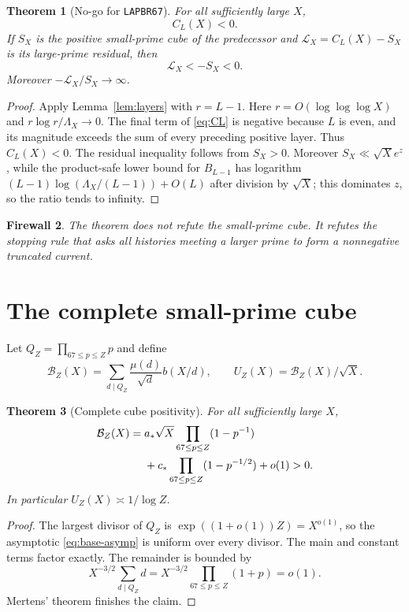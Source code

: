 \documentclass[11pt]{article}
\newtheorem{theorem}{Theorem}[section]
\newtheorem{firewall}[theorem]{Firewall}
\newcommand{\1}{\mathbf 1}
\begin{document}
\begin{theorem}[No-go for \texttt{LAPBR67}]\label{thm:no-go}
For all sufficiently large $X$,
\[
 C_L(X)<0.
\]
If $S_X$ is the positive small-prime cube of the predecessor and
$\mathcal L_X=C_L(X)-S_X$ is its large-prime residual, then
\[
 \boxed{\mathcal L_X<-S_X<0.}
\]
Moreover $-\mathcal L_X/S_X\to\infty$.
\end{theorem}
\begin{proof}
Apply Lemma~\ref{lem:layers} with $r=L-1$.  Here
$r=O(\log\log\log X)$ and $r\log r/\Lambda_X\to0$.  The final term of
\eqref{eq:CL} is negative because $L$ is even, and its magnitude exceeds the
sum of every preceding positive layer.  Thus $C_L(X)<0$.  The residual
inequality follows from $S_X>0$.  Moreover
$S_X\ll\sqrt X e^z$, while the product-safe lower bound for $B_{L-1}$ has
logarithm $(L-1)\log(\Lambda_X/(L-1))+O(L)$ after division by $\sqrt X$;
this dominates $z$, so the ratio tends to infinity.
\end{proof}

\begin{firewall}
The theorem does not refute the small-prime cube.  It refutes the stopping rule
that asks all histories meeting a larger prime to form a nonnegative truncated
current.
\end{firewall}

\section{The complete small-prime cube}
Let $Q_Z=\prod_{67\le p\le Z}p$ and define
\[
 \mathcal B_Z(X)=\sum_{d\mid Q_Z}\frac{\mu(d)}{\sqrt d}b(X/d),
 \qquad U_Z(X)=\mathcal B_Z(X)/\sqrt X.
\]

\begin{theorem}[Complete cube positivity]\label{thm:small-complete}
For all sufficiently large $X$,
\begin{align}
 \mathcal B_Z(X)
 ={}&a_*\sqrt X\prod_{67\le p\le Z}(1-p^{-1})\notag\\
 &+c_*\prod_{67\le p\le Z}(1-p^{-1/2})+o(1)>0.
\end{align}
In particular $U_Z(X)\asymp1/\log Z$.
\end{theorem}
\begin{proof}
The largest divisor of $Q_Z$ is $\exp((1+o(1))Z)=X^{o(1)}$, so the asymptotic
\eqref{eq:base-asymp} is uniform over every divisor.  The main and constant
terms factor exactly.  The remainder is bounded by
\[
 X^{-3/2}\sum_{d\mid Q_Z}d
 =X^{-3/2}\prod_{67\le p\le Z}(1+p)=o(1).
\]
Mertens' theorem finishes the claim.
\end{proof}
\end{document}
